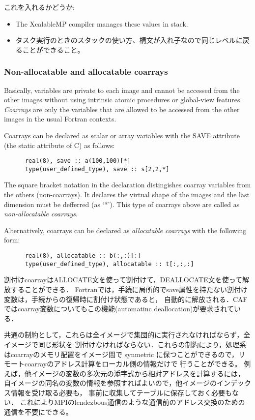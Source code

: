 これを入れるかどうか:
\begin{itemize}
\item The XcalableMP compiler manages these values in stack.
\item タスク実行のときのスタックの使い方、構文が入れ子なので同じレベルに戻ることができること。
\end{itemize}


\subsubsection{Non-allocatable and allocatable coarrays}

Basically, variables are private to each image and cannot be accessed from 
the other images without using intrinsic atomic procedures or global-view features.
{\em Coarrays} are only the variables that are allowed to be
accessed from the other images in the usual Fortran contexts. 

Coarrays can be declared as scalar or array variables with the SAVE attribute
(the static attribute of C) as follows:

\begin{verbatim}
      real(8), save :: a(100,100)[*]
      type(user_defined_type), save :: s[2,2,*]
\end{verbatim}

The square bracket notation in the declaration distingishes coarray variables from 
the others (non-coarrays). It declares the virtual shape of the images and the last 
dimension must be defferred (as `*').
This type of coarrays above are called as {\em non-allocatable coarrays}. 

Alternatively, coarrays can be declared as {\em allocatable coarrays} with the 
following form:

\begin{verbatim}
      real(8), allocatable :: b(:,:)[:]
      type(user_defined_type), allocatable :: t[:,:,:]
\end{verbatim}

割付けcoarrayはALLOCATE文を使って割付けて，DEALLOCATE文を使って解放することができる．
Fortranでは，手続に局所的でsave属性を持たない割付け変数は，手続からの復帰時に割付け状態であると，
自動的に解放される．CAFではcoarray変数についてもこの機能(automatinc deallocation)が要求されている．


共通の制約として，これらは全イメージで集団的に実行されなければならず，全イメージで同じ形状を
割付けなければならない．これらの制約により，処理系はcoarrayのメモリ配置をイメージ間で
synmetric に保つことができるので，リモートcoarrayのアドレス計算をローカル側の情報だけで
行うことができる。
例えば，他イメージの変数の多次元の添字式から相対アドレスを計算するには，
自イメージの同名の変数の情報を参照すればよいので，他イメージのインデックス情報を受け取る必要も，
事前に収集してテーブルに保存しておく必要もない．
これによりMPIのlendezbous通信のような通信前のアドレス交換のための通信を不要にできる。

